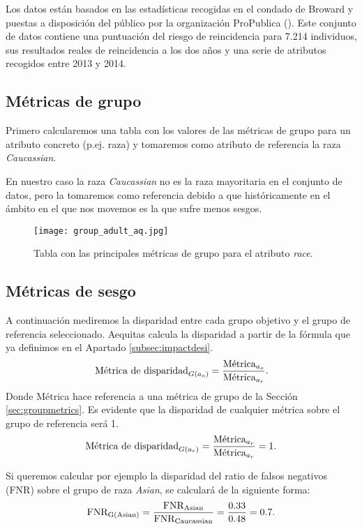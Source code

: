 Los datos están basados en las estadísticas recogidas en el condado de Broward y puestas a disposición del público por la organización ProPublica (\cite{condena2016}). Este conjunto de datos contiene una puntuación del riesgo de reincidencia para 7.214 individuos, sus resultados reales de reincidencia a los dos años y una serie de atributos recogidos entre 2013 y 2014.

\subsection*{Métricas de grupo}

Primero calcularemos una tabla con los valores de las métricas de grupo para un atributo concreto (p.ej. raza) y tomaremos como atributo de referencia la raza \textit{Caucassian}. 

En nuestro caso la raza \textit{Caucassian} no es la raza mayoritaria en el conjunto de datos, pero la tomaremos como referencia debido a que históricamente en el ámbito en el que nos movemos es la que sufre menos sesgos.\\

\begin{figure}[h]
	\centering
	\texttt{[image: group\_adult\_aq.jpg]}
	\caption{Tabla con las principales métricas de grupo para el atributo \textit{race}.}
    \label{fig:ejaq1}
\end{figure}

\subsection*{Métricas de sesgo}

A continuación mediremos la disparidad entre cada grupo objetivo y el grupo de referencia seleccionado. Aequitas calcula la disparidad a partir de la fórmula que ya definimos en el Apartado \ref{subsec:impactdesi}. $$\text{Métrica de disparidad}_{G(a_o)}=\frac{\displaystyle \text{Métrica}_{a_o}}{\displaystyle \text{Métrica}_{a_r}}.$$ Donde Métrica hace referencia a una métrica de grupo de la Sección \ref{sec:groupmetrics}. Es evidente que la disparidad de cualquier métrica sobre el grupo de referencia será 1. $$\text{Métrica de disparidad}_{G(a_r)}=\frac{\displaystyle \text{Métrica}_{a_r}}{\displaystyle \text{Métrica}_{a_r}}=1.$$

Si queremos calcular por ejemplo la disparidad del ratio de falsos negativos (FNR) sobre el grupo de raza \textit{Asian}, se calculará de la siguiente forma: $$\text{FNR}_{\text{G(Asian)}}=\frac{\displaystyle \text{FNR}_{\text{Asian}}}{\displaystyle \text{FNR}_{\text{Caucassian}}}=\frac{\displaystyle 0.33}{\displaystyle 0.48}=0.7.$$

